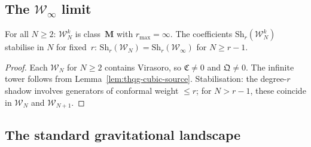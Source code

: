 
\subsection{The $\mathcal{W}_\infty$ limit}

\begin{proposition}
\ClaimStatusProvedHere
For all $N \geq 2$: $\mathcal{W}_N^k$ is class~$\mathbf{M}$
with $r_{\max} = \infty$. The coefficients
$\mathrm{Sh}_r(\mathcal{W}_N^k)$ stabilise in $N$ for fixed~$r$:
$\mathrm{Sh}_r(\mathcal{W}_N) = \mathrm{Sh}_r(\mathcal{W}_\infty)$
for $N \geq r - 1$.
\end{proposition}

\begin{proof}
Each $\mathcal{W}_N$ for $N \geq 2$ contains Virasoro,
so $\mathfrak{C} \neq 0$ and $\mathfrak{Q} \neq 0$.
The infinite tower follows from
Lemma~\ref{lem:thqg-cubic-source}.
Stabilisation: the degree-$r$ shadow involves generators of
conformal weight $\leq r$; for $N > r-1$, these coincide
in $\mathcal{W}_N$ and $\mathcal{W}_{N+1}$.
\end{proof}



\subsection{The standard gravitational landscape}

